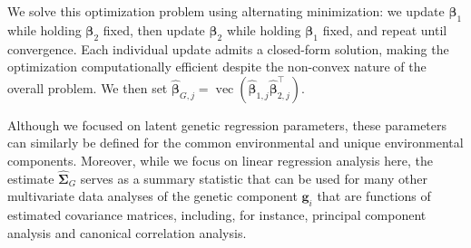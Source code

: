 \documentclass[12pt]{article}
\DeclareMathOperator{\vect}{vec}
\begin{document}
We solve this optimization problem using alternating minimization: we  update $\boldsymbol{\beta}_{1}$ while holding $\boldsymbol{\beta}_{2}$ fixed, then update $\boldsymbol{\beta}_{2}$ while holding $\boldsymbol{\beta}_{1}$ fixed, and repeat until convergence. Each individual update admits a closed-form solution, making the optimization computationally efficient despite the non-convex nature of the overall problem. We then set $\hat{\boldsymbol{\beta}}_{G,j} = \vect(\hat{\boldsymbol{\beta}}_{1,j}\hat{\boldsymbol{\beta}}_{2,j}^\top)$.


Although we focused on latent genetic regression parameters, these parameters can similarly be defined for the common environmental and unique environmental components.
Moreover, while we focus on linear regression analysis here, the estimate $\hat{\boldsymbol{\Sigma}}_G$ serves as a summary statistic that can be used for many other multivariate data analyses of the genetic component $\mathbf{g}_i$ that are functions of estimated covariance matrices, including, for instance, principal component analysis and canonical correlation analysis.


\vspace{-3.5mm}




\end{document}
